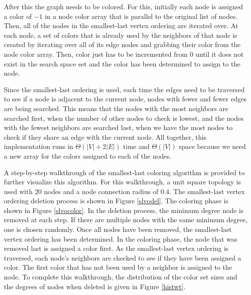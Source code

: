 \documentclass{article}
\begin{document}
        After this the graph needs to be colored. For this, initially each node is assigned a color of $-1$ in a node color array that is parallel to the original list of nodes. Then, all of the nodes in the smallest-last vertex ordering are iterated over. At each node, a set of colors that is already used by the neighbors of that node is created by iterating over all of its edge nodes and grabbing their color from the node color array. Then, color just has to be incremented from $0$ until it does not exist in the search space set and the color has been determined to assign to the node.
        \par
        Since the smallest-last ordering is used, each time the edges need to be traversed to see if a node is adjacent to the current node, nodes with fewer and fewer edges are being searched. This means that the nodes with the most neighbors are searched first, when the number of other nodes to check is lowest, and the nodes with the fewest neighbors are searched last, when we have the most nodes to check if they share an edge with the current node. All together, this implementation runs in $\Theta(|V| + 2|E|)$ time and $\Theta(|V|)$ space because we need a new array for the colors assigned to each of the nodes.
        \par
        A step-by-step walkthrough of the smallest-last coloring algorithm is provided to further visualize this algorithm. For this walkthrough, a unit square topology is used with 20 nodes and a node connection radius of 0.4. The smallest-last vertex ordering deletion process is shown in Figure \ref{slvodel}. The coloring phase is shown in Figure \ref{slvocolor}. In the deletion process, the minimum degree node is removed at each step. If there are multiple nodes with the same minimum degree, one is chosen randomly. Once all nodes have been removed, the smallest-last vertex ordering has been determined. In the coloring phase, the node that was removed last is assigned a color first. As the smallest-last vertex ordering is traversed, each node's neighbors are checked to see if they have been assigned a color. The first color that has not been used by a neighbor is assigned to the node. To complete this walkthrough, the distribution of the color set sizes and the degrees of nodes when deleted is given in Figure \ref{histwt}.
\end{document}
